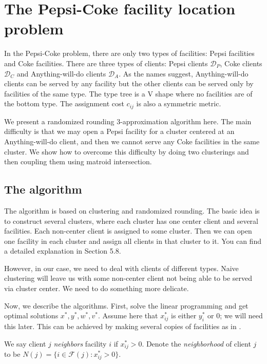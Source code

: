 \section{The Pepsi-Coke facility location problem}

In the Pepsi-Coke problem, there are only two types of facilities: Pepsi facilities and Coke facilities. There are three types of clients: Pepsi clients $\mathcal{D}_P$, Coke clients $\mathcal{D}_C$ and Anything-will-do clients $\mathcal{D}_A$. As the names suggest, Anything-will-do clients can be served by any facility but the other clients can be served only by facilities of the same type. The type tree is a V shape where no facilities are of the bottom type. The assignment cost $c_{ij}$ is also a symmetric metric.

We present a randomized rounding 3-approximation algorithm here. The main difficulty is that we may open a Pepsi facility for a cluster centered at an Anything-will-do client, and then we cannot serve any Coke facilities in the same cluster. We show how to overcome this difficulty by doing two clusterings and then coupling them using matroid intersection.

\subsection{The algorithm}

The algorithm is based on clustering and randomized rounding. The basic idea is to construct several clusters, where each cluster has one center client and several facilities. Each non-center client is assigned to some cluster. Then we can open one facility in each cluster and assign all clients in that cluster to it. You can find a detailed explanation in \cite{williamson2011design} Section 5.8.

However, in our case, we need to deal with clients of different types. Naive clustering will leave us with some non-center client not being able to be served via cluster center. We need to do something more delicate.

Now, we describe the algorithms. First, solve the linear programming and get optimal solutions $x^*, y^*, w^*, v^*$. Assume here that $x^*_{ij}$ is either $y^*_i$ or $0$; we will need this later. This can be achieved by making several copies of facilities as in \cite{chudak2003improved}.

\begin{defn}
We say client $j$ {\it neighbors} facility $i$ if $x^*_{ij} > 0$.
Denote the {\it neighborhood} of client $j$ to be $N(j) = \{i \in \mathcal{F}(j) : x^*_{ij} > 0 \}$.
\end{defn}

